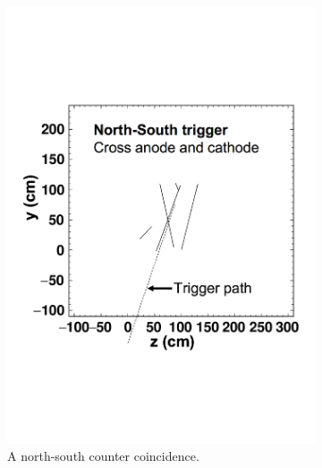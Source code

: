 \begin{figure}
  \centering
  \begin{subfigure}{0.48\textwidth}
    \centering
    \includegraphics[width=\textwidth]{north-south}
    \caption{A north-south counter coincidence.}
  \end{subfigure}%
  \hspace{0.03\textwidth}%
  \begin{subfigure}{0.48\textwidth}
    \centering

\end{subfigure}
\end{figure}
